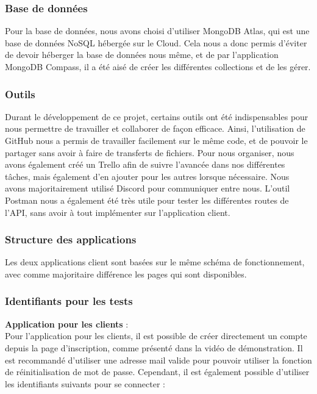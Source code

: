 \documentclass[../rapport.tex]{subfiles}
\begin{document}
\subsubsection{Base de données}
Pour la base de données, nous avons choisi d'utiliser MongoDB Atlas, qui est une base de données NoSQL hébergée sur le Cloud. Cela nous a donc permis d'éviter de devoir héberger la base de données nous même, et de par l'application MongoDB Compass, il a été aisé de créer les différentes collections et de les gérer. 

\subsubsection{Outils}
Durant le développement de ce projet, certains outils ont été indispensables pour nous permettre de travailler et collaborer de façon efficace. Ainsi, l'utilisation de GitHub nous a permis de travailler facilement sur le même code, et de pouvoir le partager sans avoir à faire de transferts de fichiers. Pour nous organiser, nous avons également créé un Trello afin de suivre l'avancée dans nos différentes tâches, mais également d'en ajouter pour les autres lorsque nécessaire. Nous avons majoritairement utilisé Discord pour communiquer entre nous. L'outil Postman nous a également été très utile pour tester les différentes routes de l'API, sans avoir à tout implémenter sur l'application client.

\subsubsection{Structure des applications}
Les deux applications client sont basées sur le même schéma de fonctionnement, avec comme majoritaire différence les pages qui sont disponibles. 

\subsubsection{Identifiants pour les tests}
\textbf{Application pour les clients} : \\ 
Pour l'application pour les clients, il est possible de créer directement un compte depuis la page d'inscription, comme présenté dans la vidéo de démonstration. Il est recommandé d'utiliser une adresse mail valide pour pouvoir utiliser la fonction de réinitialisation de mot de passe. Cependant, il est également possible d'utiliser les identifiants suivants pour se connecter :\\
\end{document}
